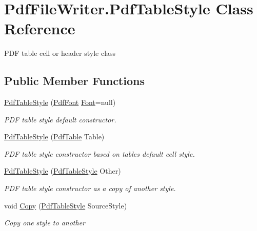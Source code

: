 \hypertarget{class_pdf_file_writer_1_1_pdf_table_style}{}\section{Pdf\+File\+Writer.\+Pdf\+Table\+Style Class Reference}
\label{class_pdf_file_writer_1_1_pdf_table_style}


P\+DF table cell or header style class  


\subsection*{Public Member Functions}
\begin{DoxyCompactItemize}
\item 
\hyperlink{class_pdf_file_writer_1_1_pdf_table_style_aef285f98480b6b853dd062407644c9fb}{Pdf\+Table\+Style} (\hyperlink{class_pdf_file_writer_1_1_pdf_font}{Pdf\+Font} \hyperlink{class_pdf_file_writer_1_1_pdf_table_style_a862b654b3ee257db021e515cc358739a}{Font}=null)
\begin{DoxyCompactList}\small\item\em P\+DF table style default constructor. \end{DoxyCompactList}\item 
\hyperlink{class_pdf_file_writer_1_1_pdf_table_style_a2c0ef014e981a125c949efcf41c77d60}{Pdf\+Table\+Style} (\hyperlink{class_pdf_file_writer_1_1_pdf_table}{Pdf\+Table} Table)
\begin{DoxyCompactList}\small\item\em P\+DF table style constructor based on table\textquotesingle{}s default cell style. \end{DoxyCompactList}\item 
\hyperlink{class_pdf_file_writer_1_1_pdf_table_style_a1decd82228ceeef8c4a33134a60b3d91}{Pdf\+Table\+Style} (\hyperlink{class_pdf_file_writer_1_1_pdf_table_style}{Pdf\+Table\+Style} Other)
\begin{DoxyCompactList}\small\item\em P\+DF table style constructor as a copy of another style. \end{DoxyCompactList}\item 
void \hyperlink{class_pdf_file_writer_1_1_pdf_table_style_af1a15a7fa5f01e82eb2aafa3b3252c7d}{Copy} (\hyperlink{class_pdf_file_writer_1_1_pdf_table_style}{Pdf\+Table\+Style} Source\+Style)
\begin{DoxyCompactList}\small\item\em Copy one style to another \end{DoxyCompactList}\end{DoxyCompactItemize}
